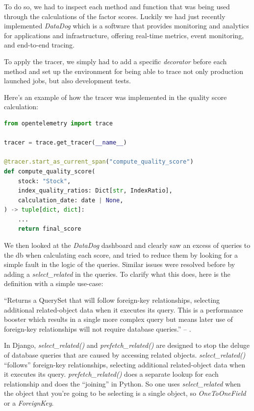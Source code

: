 \documentclass[11pt,english,a4paper,hidelinks]{book}
\begin{document}
\vspace{0.5cm}
\noindent To do so, we had to inspect each method and function that was being used through the calculations of the factor scores. Luckily we had just recently implemented \textit{DataDog} which is a software that provides monitoring and analytics for applications and infrastructure, offering real-time metrics, event monitoring, and end-to-end tracing.

\vspace{0.5cm}
\noindent To apply the tracer, we simply had to add a specific \textit{\acrshort*{decorator}} before each method and set up the environment for being able to trace not only production launched jobs, but also development tests.

\vspace{0.5cm}
\noindent Here's an example of how the tracer was implemented in the quality score calculation:

\begin{lstlisting}[language=Python, caption=Telemetry Tracing Implementation, label={lst:telemetry_tracing_implementation}]
from opentelemetry import trace

tracer = trace.get_tracer(__name__)

@tracer.start_as_current_span("compute_quality_score")
def compute_quality_score(
    stock: "Stock",
    index_quality_ratios: Dict[str, IndexRatio],
    calculation_date: date | None,
) -> tuple[dict, dict]:
    ...
    return final_score
\end{lstlisting}

\noindent We then looked at the \textit{DataDog} dashboard and clearly saw an excess of queries to the \acrshort{db} when calculating each score, and tried to reduce them by looking for a simple fault in the logic of the queries. Similar issues were resolved before by adding a \textit{select\_related} in the queries. To clarify what this does, here is the definition with a simple use-case:

\vspace{0.5cm}
\noindent ``Returns a QuerySet that will follow foreign-key relationships, selecting additional related-object data when it executes its query. This is a performance booster which results in a single more complex query but means later use of foreign-key relationships will not require database queries.'' -- \textcite{django2025selectrelated}.

\vspace{0.5cm}
\noindent In Django, \textit{select\_related()} and \textit{prefetch\_related()} are designed to stop the deluge of database queries that are caused by accessing related objects. \textit{select\_related()} ``follows'' foreign-key relationships, selecting additional related-object data when it executes its query. \textit{prefetch\_related()} does a separate lookup for each relationship and does the ``joining'' in Python. So one uses \textit{select\_related} when the object that you're going to be selecting is a single object, so \textit{OneToOneField} or a \textit{ForeignKey}.
\end{document}
